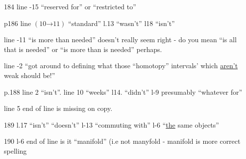 184 line -15 ``reserved for'' or ``restricted to''
\reversemarginpar
{}
\normalmarginpar

p186 line $(10\mathord{\to}11)$ ``standard'' l.13 ``wasn't'' l18 ``isn't''

line -11 ``is more than needed'' doesn't really seem right - do you mean ``is all that is needed'' or ``is more than is needed'' perhaps.

line -2 ``got around to defining  what those ``homotopy'' intervals' which \uline{aren't} weak should be!''

p.188 line 2 ``isn't''. line 10 ``weeks'' l14. ``didn't'' l-9 presumably ``whatever for''

line 5  end of line is missing on copy.

189 l.17 ``isn't'' ``doesn't'' l-13 ``commuting with'' l-6 ``\uline{the} same objects''

190 l-6 end of line is it ``manifold'' (i.e not manyfold\deleted{)} - manifold is  more correct spelling


